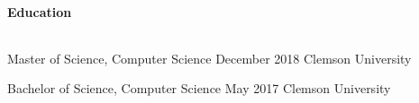\documentclass{article}
\begin{document}
  \setlength{\parskip}{0.0in}
  \paragraph{Education} $ $
  \setlength{\parskip}{0.1in}

  \hangindent=0.8in
  Master of Science, Computer Science \hfill December 2018 \newline
  Clemson University \newline

  \hangindent=0.8in
  Bachelor of Science, Computer Science \hfill May 2017 \newline
  Clemson University
  
\end{document}
